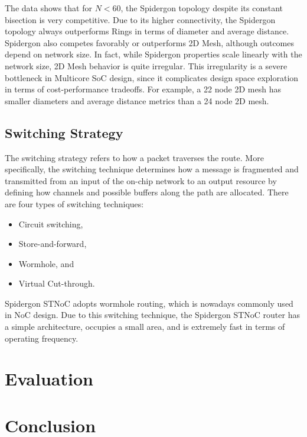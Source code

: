 The data shows that for ${N < 60}$, the Spidergon topology despite its constant bisection is very competitive. 
Due to its higher connectivity, the Spidergon topology always outperforms Rings in terms of diameter and average distance. Spidergon also competes favorably or outperforms 2D Mesh, although outcomes depend on network size. 
In fact, while Spidergon properties scale linearly with the network size, 2D Mesh behavior is quite irregular. 
This irregularity is a severe bottleneck in Multicore SoC design, since it complicates design space exploration in terms of cost-performance tradeoffs. For example, a 22 node 2D mesh has smaller diameters and average distance metrics than a 24 node 2D mesh.

\subsection{Switching Strategy}\label{S:switching}

The switching strategy refers to how a packet traverses the route. 
More specifically, the switching technique determines how a message is fragmented and transmitted from an input of the on-chip network to an output resource by defining how channels and possible buffers along the path are allocated. 
There are four types of switching techniques:
\begin{itemize}
\item Circuit switching,
\item Store-and-forward,
\item Wormhole, and 
\item Virtual Cut-through.
\end{itemize}

Spidergon STNoC adopts wormhole routing, which is nowadays commonly used in NoC design. 
Due to this switching technique, the Spidergon STNoC router has a simple architecture, occupies a small area, and is extremely fast in terms of operating frequency.

\section{Evaluation}\label{C:evaluation}

\section{Conclusion}\label{S:conclusion}






